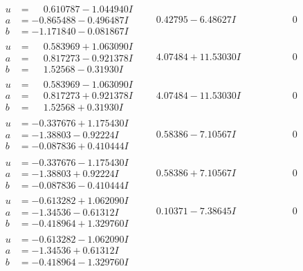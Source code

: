 \documentclass[1p]{elsarticle_modified}
\theoremstyle{definition}
\begin{document}
$$\begin{array}{c|c|c}
\begin{aligned}
u &= \phantom{-}0.610787 - 1.044940 I \\
a &= -0.865488 - 0.496487 I \\
b &= -1.171840 - 0.081867 I\end{aligned}
 & \phantom{-}0.42795 - 6.48627 I & \phantom{-0.000000 } 0 \\ \hline\begin{aligned}
u &= \phantom{-}0.583969 + 1.063090 I \\
a &= \phantom{-}0.817273 - 0.921378 I \\
b &= \phantom{-}1.52568 - 0.31930 I\end{aligned}
 & \phantom{-}4.07484 + 11.53030 I & \phantom{-0.000000 } 0 \\ \hline\begin{aligned}
u &= \phantom{-}0.583969 - 1.063090 I \\
a &= \phantom{-}0.817273 + 0.921378 I \\
b &= \phantom{-}1.52568 + 0.31930 I\end{aligned}
 & \phantom{-}4.07484 - 11.53030 I & \phantom{-0.000000 } 0 \\ \hline\begin{aligned}
u &= -0.337676 + 1.175430 I \\
a &= -1.38803 - 0.92224 I \\
b &= -0.087836 + 0.410444 I\end{aligned}
 & \phantom{-}0.58386 - 7.10567 I & \phantom{-0.000000 } 0 \\ \hline\begin{aligned}
u &= -0.337676 - 1.175430 I \\
a &= -1.38803 + 0.92224 I \\
b &= -0.087836 - 0.410444 I\end{aligned}
 & \phantom{-}0.58386 + 7.10567 I & \phantom{-0.000000 } 0 \\ \hline\begin{aligned}
u &= -0.613282 + 1.062090 I \\
a &= -1.34536 - 0.61312 I \\
b &= -0.418964 + 1.329760 I\end{aligned}
 & \phantom{-}0.10371 - 7.38645 I & \phantom{-0.000000 } 0 \\ \hline\begin{aligned}
u &= -0.613282 - 1.062090 I \\
a &= -1.34536 + 0.61312 I \\
b &= -0.418964 - 1.329760 I\end{aligned}

\end{array}$$
\end{document}
